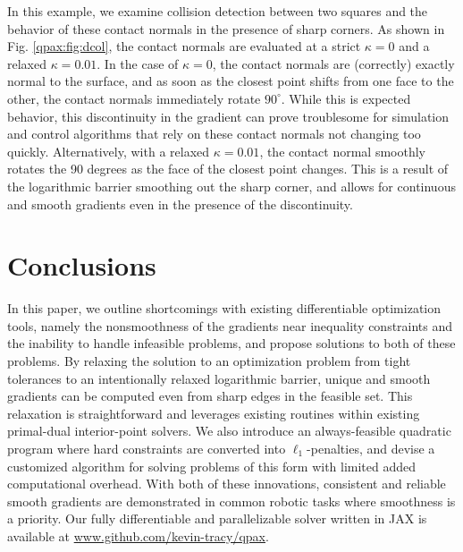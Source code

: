 In this example, we examine collision detection between two squares and the behavior of these contact normals in the presence of sharp corners. As shown in Fig. \ref{qpax:fig:dcol}, the contact normals are evaluated at a strict $\kappa=0$ and a relaxed $\kappa=0.01$. In the case of $\kappa=0$, the contact normals are (correctly) exactly normal to the surface, and as soon as the closest point shifts from one face to the other, the contact normals immediately rotate $90^\circ$. While this is expected behavior, this discontinuity in the gradient can prove troublesome for simulation and control algorithms that rely on these contact normals not changing too quickly. Alternatively, with a relaxed $\kappa=0.01$, the contact normal smoothly rotates the 90 degrees as the face of the closest point changes. This is a result of the logarithmic barrier smoothing out the sharp corner, and allows for continuous and smooth gradients even in the presence of the discontinuity. 
\section{Conclusions}
In this paper, we outline shortcomings with existing differentiable optimization tools, namely the nonsmoothness of the gradients near inequality constraints and the inability to handle infeasible problems, and propose solutions to both of these problems. By relaxing the solution to an optimization problem from tight tolerances to an intentionally relaxed logarithmic barrier, unique and smooth gradients can be computed even from sharp edges in the feasible set. This relaxation is straightforward and leverages existing routines within existing primal-dual interior-point solvers. We also introduce an always-feasible quadratic program where hard constraints are converted into $\ell_1$-penalties, and devise a customized algorithm for solving problems of this form with limited added computational overhead. With both of these innovations, consistent and reliable smooth gradients are demonstrated in common robotic tasks where smoothness is a priority. Our fully differentiable and parallelizable solver written in JAX is available at \url{www.github.com/kevin-tracy/qpax}.